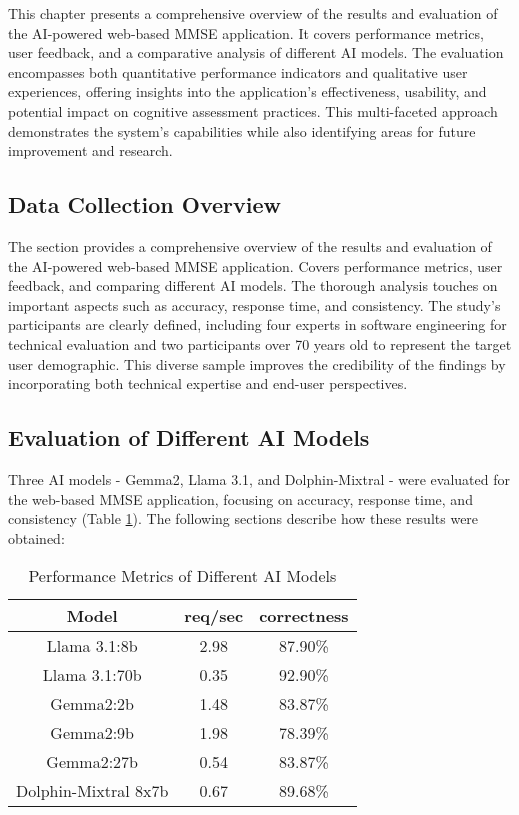 This chapter presents a comprehensive overview of the results and evaluation of the AI-powered web-based MMSE application. It covers performance metrics, user feedback, and a comparative analysis of different AI models. The evaluation encompasses both quantitative performance indicators and qualitative user experiences, offering insights into the application's effectiveness, usability, and potential impact on cognitive assessment practices. This multi-faceted approach demonstrates the system's capabilities while also identifying areas for future improvement and research.

\subsection{Data Collection Overview}
The section provides a comprehensive overview of the results and evaluation of the AI-powered web-based MMSE application. Covers performance metrics, user feedback, and comparing different AI models. The thorough analysis touches on important aspects such as accuracy, response time, and consistency. The study's participants are clearly defined, including four experts in software engineering for technical evaluation and two participants over 70 years old to represent the target user demographic. This diverse sample improves the credibility of the findings by incorporating both technical expertise and end-user perspectives.

\subsection{Evaluation of Different AI Models}
Three AI models - Gemma2, Llama 3.1, and Dolphin-Mixtral - were evaluated for the web-based MMSE application, focusing on accuracy, response time, and consistency (Table \ref{tab:model_comparison}). The following sections describe how these results were obtained:

\begin{table}[ht]
\centering
\begin{tabular}{|c|c|c|}
\hline
\textbf{Model} & \textbf{req/sec} & \textbf{correctness} \\
\hline
Llama 3.1:8b & 2.98 & 87.90\% \\
Llama 3.1:70b & 0.35 & 92.90\% \\
Gemma2:2b & 1.48 & 83.87\% \\
Gemma2:9b & 1.98 & 78.39\% \\
Gemma2:27b & 0.54 & 83.87\% \\
Dolphin-Mixtral 8x7b & 0.67 & 89.68\% \\
\hline
\end{tabular}
\caption{Performance Metrics of Different AI Models}
\label{tab:model_comparison}
\end{table}

